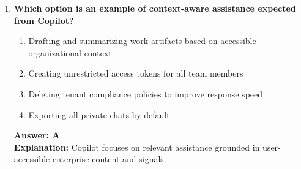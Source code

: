 \documentclass[10pt]{article}
\begin{document}
\begin{enumerate}[leftmargin=*]
\item \textbf{Which option is an example of context-aware assistance expected from Copilot?}
\begin{enumerate}[label=\Alph*.]
  \item Drafting and summarizing work artifacts based on accessible organizational context
  \item Creating unrestricted access tokens for all team members
  \item Deleting tenant compliance policies to improve response speed
  \item Exporting all private chats by default
\end{enumerate}
\textbf{Answer: A}\\
\textbf{Explanation:} Copilot focuses on relevant assistance grounded in user-accessible enterprise content and signals.

\end{enumerate}


\clearpage
\end{document}
